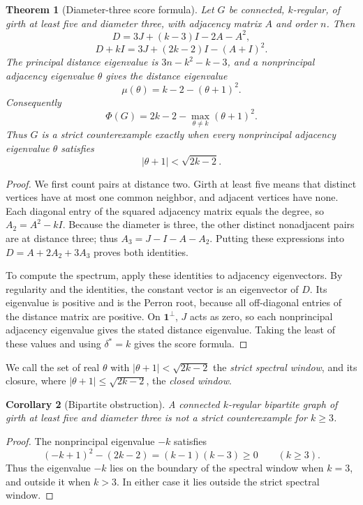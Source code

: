 \documentclass[a4paper,10pt,reqno]{amsart}
\theoremstyle{plain}
\newtheorem{theorem}{Theorem}[section]
\newtheorem{corollary}[theorem]{Corollary}
\theoremstyle{definition}
\theoremstyle{remark}
\newcommand{\one}{\mathbf 1}
\newcommand{\resultbox}[1]{\boxed{#1}}
\begin{document}
\begin{theorem}[Diameter-three score formula]\label{thm:diameter-three-score}
Let \(G\) be connected, \(k\)-regular, of girth at least five and diameter
three, with adjacency matrix \(A\) and order \(n\).  Then
\[
 D=3J+(k-3)I-2A-A^2,
\]
\[
 D+kI=3J+(2k-2)I-(A+I)^2.
\]
The principal distance eigenvalue is \(3n-k^2-k-3\), and a nonprincipal
adjacency eigenvalue \(\theta\) gives the distance eigenvalue
\[
 \mu(\theta)=k-2-(\theta+1)^2.
\]
Consequently
\[
 \resultbox{
 \Phi(G)=2k-2-\max_{\theta\ne k}(\theta+1)^2.
 }
\]
Thus \(G\) is a strict counterexample exactly when every nonprincipal
adjacency eigenvalue \(\theta\) satisfies
\[
 |\theta+1|<\sqrt{2k-2}.
\]
\end{theorem}

\begin{proof}
We first count pairs at distance two.  Girth at least five means that
distinct vertices have at most one common neighbor, and adjacent vertices
have none.  Each diagonal entry of the squared adjacency matrix equals the
degree, so \(A_2=A^2-kI\).  Because the diameter is three, the other distinct
nonadjacent pairs are at distance three; thus \(A_3=J-I-A-A_2\).
Putting these expressions into \(D=A+2A_2+3A_3\) proves both identities.

To compute the spectrum, apply these identities to adjacency eigenvectors.
By regularity and the identities, the constant vector is an eigenvector of \(D\). Its
eigenvalue is positive and is the Perron root, because all off-diagonal
entries of the distance matrix are positive.  On \(\one^\perp\), \(J\) acts as zero, so each
nonprincipal adjacency eigenvalue gives the stated distance eigenvalue.
Taking the least of these values and using \(\delta^*=k\) gives the score formula.
\end{proof}

We call the set of real \(\theta\) with \(|\theta+1|<\sqrt{2k-2}\) the
\emph{strict spectral window}, and its closure, where
\(|\theta+1|\le\sqrt{2k-2}\), the \emph{closed window}.

\begin{corollary}[Bipartite obstruction]\label{cor:bipartite}
A connected \(k\)-regular bipartite graph of girth at least five and diameter
three is not a strict counterexample for \(k\ge3\).
\end{corollary}

\begin{proof}
The nonprincipal eigenvalue \(-k\) satisfies
\[
 (-k+1)^2-(2k-2)=(k-1)(k-3)\ge0
 \qquad(k\ge3).
\]
Thus the eigenvalue \(-k\) lies on the boundary of the spectral window
when \(k=3\), and outside it when \(k>3\). In either case it lies outside
the strict spectral window.
\end{proof}
\end{document}
